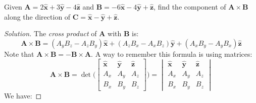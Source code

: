 \documentclass[crop=false,class=book,oneside]{standalone}
\begin{document}
            \begin{problem}[Wangsness 1-5]
                Given 
                $\mathbf{A}=2\hat{\mathbf{x}}%
                 +3\hat{\mathbf{y}}-4\hat{\mathbf{z}}$
                and
                $\mathbf{B}%
                 =-6\hat{\mathbf{x}}-4\hat{\mathbf{y}}%
                 +\hat{\mathbf{z}}$,
                find the component of
                $\mathbf{A}\times\mathbf{B}$
                along the direction of
                $\mathbf{C}%
                 =\hat{\mathbf{x}}-\hat{\mathbf{y}}%
                 +\hat{\mathbf{z}}$.
            \end{problem}
            \begin{proof}[Solution]
                The \textit{cross product} of $\mathbf{A}$
                with $\mathbf{B}$ is:
                \begin{equation*}
                    \mathbf{A}\times\mathbf{B}
                    =(A_{y}B_{z}-A_{z}B_{y})\hat{\mathbf{x}}
                    +(A_{z}B_{x}-A_{x}B_{z})\hat{\mathbf{y}}
                    +(A_{x}B_{y}-A_{y}B_{x})\hat{\mathbf{z}}
                \end{equation*}
                Note that
                $\mathbf{A}\times\mathbf{B}%
                 =-\mathbf{B}\times\mathbf{A}$.
                A way to remember this formula is using matrices:
                \begin{equation*}
                    \mathbf{A}\times\mathbf{B}
                    =\det\Bigg(
                        \begin{bmatrix}
                            \hat{\mathbf{x}}
                            &\hat{\mathbf{y}}
                            &\hat{\mathbf{z}}\\
                            A_{x}&A_{y}&A_{z}\\
                            B_{x}&B_{y}&B_{z}
                        \end{bmatrix}
                    \Bigg)
                    =
                    \begin{vmatrix}
                        \hat{\mathbf{x}}
                        &\hat{\mathbf{y}}
                        &\hat{\mathbf{z}}\\
                        A_{x}&A_{y}&A_{z}\\
                        B_{x}&B_{y}&B_{z}
                    \end{vmatrix}
                \end{equation*}
                We have:

\end{proof}
\end{document}

